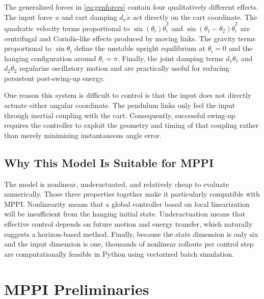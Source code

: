 \documentclass[conference]{IEEEtran}
\begin{document}
The generalized forces in \eqref{eq:genforces} contain four qualitatively different effects. The input force $u$ and cart damping $d_x\dot{x}$ act directly on the cart coordinate. The quadratic velocity terms proportional to $\sin(\theta_i)\dot{\theta}_i^2$ and $\sin(\theta_1-\theta_2)\dot{\theta}_i^2$ are centrifugal and Coriolis-like effects produced by moving links. The gravity terms proportional to $\sin\theta_i$ define the unstable upright equilibrium at $\theta_i=0$ and the hanging configuration around $\theta_i=\pi$. Finally, the joint damping terms $d_1\dot{\theta}_1$ and $d_2\dot{\theta}_2$ regularize oscillatory motion and are practically useful for reducing persistent post-swing-up energy.

One reason this system is difficult to control is that the input does not directly actuate either angular coordinate. The pendulum links only feel the input through inertial coupling with the cart. Consequently, successful swing-up requires the controller to exploit the geometry and timing of that coupling rather than merely minimizing instantaneous angle error.

\subsection{Why This Model Is Suitable for MPPI}
The model is nonlinear, underactuated, and relatively cheap to evaluate numerically. Those three properties together make it particularly compatible with MPPI. Nonlinearity means that a global controller based on local linearization will be insufficient from the hanging initial state. Underactuation means that effective control depends on future motion and energy transfer, which naturally suggests a horizon-based method. Finally, because the state dimension is only six and the input dimension is one, thousands of nonlinear rollouts per control step are computationally feasible in Python using vectorized batch simulation.

\section{MPPI Preliminaries}
\end{document}
